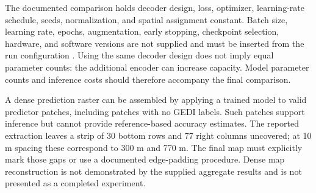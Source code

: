 The documented comparison holds decoder design, loss, optimizer, learning-rate schedule, seeds, normalization, and spatial assignment constant. Batch size, learning rate, epochs, augmentation, early stopping, checkpoint selection, hardware, and software versions are not supplied and must be inserted from the run configuration . Using the same decoder design does not imply equal parameter counts: the additional encoder can increase capacity. Model parameter counts and inference costs should therefore accompany the final comparison.

A dense prediction raster can be assembled by applying a trained model to valid predictor patches, including patches with no GEDI labels. Such patches support inference but cannot provide reference-based accuracy estimates. The reported extraction leaves a strip of 30 bottom rows and 77 right columns uncovered; at 10 m spacing these correspond to 300 m and 770 m. The final map must explicitly mark those gaps or use a documented edge-padding procedure. Dense map reconstruction is not demonstrated by the supplied aggregate results and is not presented as a completed experiment.
